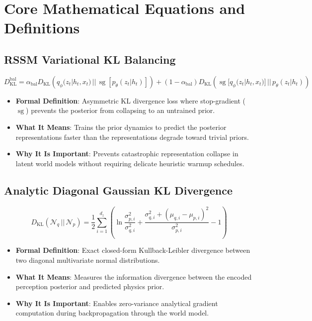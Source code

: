 \documentclass[11pt,a4paper]{article}
\theoremstyle{definition}
\begin{document}
\section{Core Mathematical Equations and Definitions}

\subsection{RSSM Variational KL Balancing}
{\boldmath
\begin{equation}
D_{\text{KL}}^{\text{bal}} = \alpha_{\text{bal}} D_{\text{KL}}\left( q_\phi(z_t | h_t, x_t) \,||\, \operatorname{sg}[p_\theta(z_t | h_t)] \right) + (1 - \alpha_{\text{bal}}) D_{\text{KL}}\left( \operatorname{sg}[q_\phi(z_t | h_t, x_t)] \,||\, p_\theta(z_t | h_t) \right)
\end{equation}
}
\begin{itemize}
    \item \textbf{Formal Definition}: Asymmetric KL divergence loss where stop-gradient ($\operatorname{sg}$) prevents the posterior from collapsing to an untrained prior.
    \item \textbf{What It Means}: Trains the prior dynamics to predict the posterior representations faster than the representations degrade toward trivial priors.
    \item \textbf{Why It Is Important}: Prevents catastrophic representation collapse in latent world models without requiring delicate heuristic warmup schedules.
\end{itemize}

\subsection{Analytic Diagonal Gaussian KL Divergence}
{\boldmath
\begin{equation}
D_{\text{KL}}(\mathcal{N}_q \,||\, \mathcal{N}_p) = \frac{1}{2}\sum_{i=1}^{d_z} \left( \ln\frac{\sigma_{p,i}^2}{\sigma_{q,i}^2} + \frac{\sigma_{q,i}^2 + (\mu_{q,i} - \mu_{p,i})^2}{\sigma_{p,i}^2} - 1 \right)
\end{equation}
}
\begin{itemize}
    \item \textbf{Formal Definition}: Exact closed-form Kullback-Leibler divergence between two diagonal multivariate normal distributions.
    \item \textbf{What It Means}: Measures the information divergence between the encoded perception posterior and predicted physics prior.
    \item \textbf{Why It Is Important}: Enables zero-variance analytical gradient computation during backpropagation through the world model.
\end{itemize}
\end{document}
